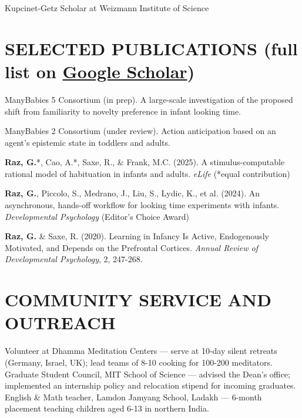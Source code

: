 \documentclass[11pt]{article}
\begin{document}
 Kupcinet-Getz Scholar at Weizmann Institute of Science

\section*{SELECTED PUBLICATIONS (full list on \href{https://scholar.google.com/citations?user=kL4kXcEAAAAJ&hl=en}{Google Scholar})}

ManyBabies 5 Consortium (in prep). A large-scale investigation of the proposed shift from familiarity to novelty preference in infant looking time.

\smallbreak

ManyBabies 2 Consortium (under review). Action anticipation based on an agent's epistemic state in toddlers and adults.

\smallbreak

\textbf{Raz, G.}*, Cao, A.*, Saxe, R., \& Frank, M.C. (2025). A stimulus-computable rational model of habituation in infants and adults. \textit{eLife} (*equal contribution)

\smallbreak

\textbf{Raz, G.}, Piccolo, S., Medrano, J., Liu, S., Lydic, K., et al. (2024). An asynchronous, hands-off workflow for looking time experiments with infants. \textit{Developmental Psychology} (Editor's Choice Award)

\smallbreak

\textbf{Raz, G.} \& Saxe, R. (2020). Learning in Infancy Is Active, Endogenously Motivated, and Depends on the Prefrontal Cortices. \textit{Annual Review of Developmental Psychology}, 2, 247-268.

\section*{COMMUNITY SERVICE AND OUTREACH}

 Volunteer at Dhamma Meditation Centers — serve at 10-day silent retreats (Germany, Israel, UK); lead teams of 8-10 cooking for 100-200 meditators. \\
 Graduate Student Council, MIT School of Science — advised the Dean's office; implemented an internship policy and relocation stipend for incoming graduates. \\
 English \& Math teacher, Lamdon Jamyang School, Ladakh — 6-month placement teaching children aged 6-13 in northern India.
\end{document}
